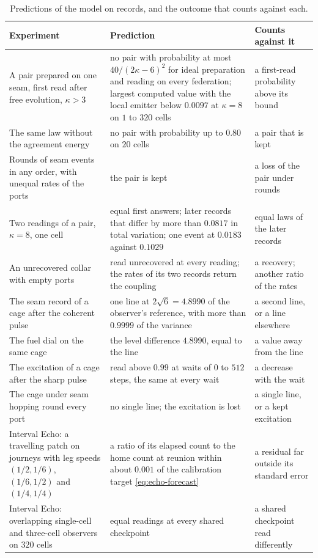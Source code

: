 \documentclass[11pt]{article}
\theoremstyle{definition}
\theoremstyle{remark}
\theoremstyle{plain}
\begin{document}
\begin{table}[!htb]
\centering\small
\caption{Predictions of the model on records, and the outcome that counts
against each.}
\label{tab:predictions}
\begin{tabular}{@{}L{4.6cm}L{6.3cm}L{4.4cm}@{}}
\toprule
Experiment & Prediction & Counts against it \\
\midrule
A pair prepared on one seam, first read after free evolution, $\kappa>3$ & no pair with probability at most $40/(2\kappa-6)^2$ for ideal preparation and reading on every federation; largest computed value with the local emitter below $0.0097$ at $\kappa=8$ on $1$ to $320$ cells & a first-read probability above its bound \\
The same law without the agreement energy & no pair with probability up to $0.80$ on $20$ cells & a pair that is kept \\
Rounds of seam events in any order, with unequal rates of the ports & the pair is kept & a loss of the pair under rounds \\
Two readings of a pair, $\kappa=8$, one cell & equal first answers; later records that differ by more than $0.0817$ in total variation; one event at $0.0183$ against $0.1029$ & equal laws of the later records \\
An unrecovered collar with empty ports & read unrecovered at every reading; the rates of its two records return the coupling & a recovery; another ratio of the rates \\
The seam record of a cage after the coherent pulse & one line at $2\sqrt6=4.8990$ of the observer's reference, with more than $0.9999$ of the variance & a second line, or a line elsewhere \\
The fuel dial on the same cage & the level difference $4.8990$, equal to the line & a value away from the line \\
The excitation of a cage after the sharp pulse & read above $0.99$ at waits of $0$ to $512$ steps, the same at every wait & a decrease with the wait \\
The cage under seam hopping round every port & no single line; the excitation is lost & a single line, or a kept excitation \\
Interval Echo: a travelling patch on journeys with leg speeds $(1/2,1/6)$, $(1/6,1/2)$ and $(1/4,1/4)$ & a ratio of its elapsed count to the home count at reunion within about $0.001$ of the calibration target \eqref{eq:echo-forecast} & a residual far outside its standard error \\
Interval Echo: overlapping single-cell and three-cell observers on $320$ cells & equal readings at every shared checkpoint & a shared checkpoint read differently \\
\bottomrule
\end{tabular}
\end{table}
\end{document}
